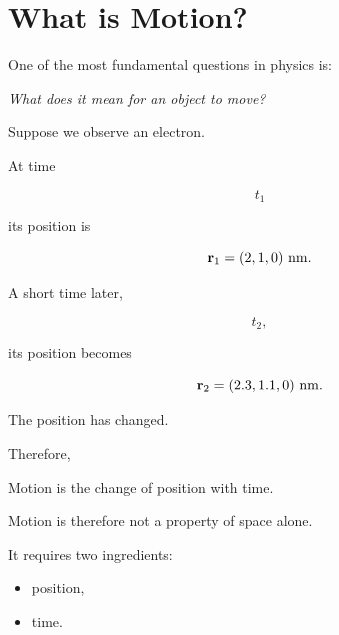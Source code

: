 \section{What is Motion?}

One of the most fundamental questions in physics is:

\begin{center}
	\emph{What does it mean for an object to move?}
\end{center}

Suppose we observe an electron.

At time

\[
t_1
\]

its position is

\[
\mathbf r_1
=
(2,1,0)\ {\rm nm}.
\]

A short time later,

\[
t_2,
\]

its position becomes

\[
\mathbf r_2
=
(2.3,1.1,0)\ {\rm nm}.
\]

The position has changed.

Therefore,

\begin{keyidea}
Motion is the change of position with time.
\end{keyidea}

Motion is therefore not a property of space alone.

It requires two ingredients:

\begin{itemize}
	\item position,
	\item time.
\end{itemize}

